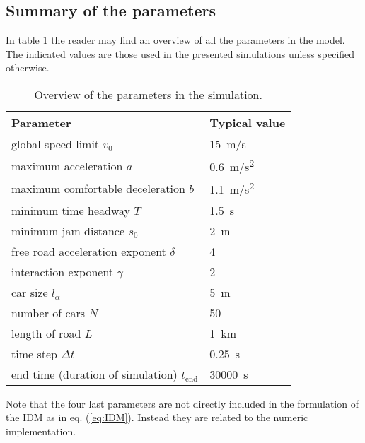 \subsection{Summary of the parameters}
In table \ref{tab:param} the reader may find an overview of all the parameters in the model. The indicated values are those used in the presented simulations unless specified otherwise.
\begin{table}
    \begin{center}
        \begin{tabular}[pos]{p{} p{}}
            \toprule
            Parameter & Typical value\\
            \midrule
            global speed limit $v_0$ & \SI{15}{m/s} \\
            maximum acceleration $a$ & \SI{0.6}{m/s^2} \\
            maximum comfortable deceleration $b$ & \SI{1.1}{m/s^2} \\
            minimum time headway $T$ & \SI{1.5}{s} \\
            minimum jam distance $s_0$ & \SI{2}{m} \\
            free road acceleration exponent $\delta$ & 4 \\
            interaction exponent $\gamma$ & 2\\
            car size $l_\alpha$ & \SI{5}{m} \\
            number of cars $N$ & 50\\
            length of road $L$ & \SI{1}{km} \\
            time step $\Delta t$ & \SI{0.25}{s} \\
            end time (duration of simulation) $t_\mathrm{end}$ &  \SI{30000}{s}\\
            \bottomrule
        \end{tabular}
    \end{center}
    \caption{Overview of the parameters in the simulation.}
    \label{tab:param}
\end{table}


Note that the four last parameters are not directly included in the formulation of the IDM as in eq. (\ref{eq:IDM}). Instead they are related to the numeric implementation.
